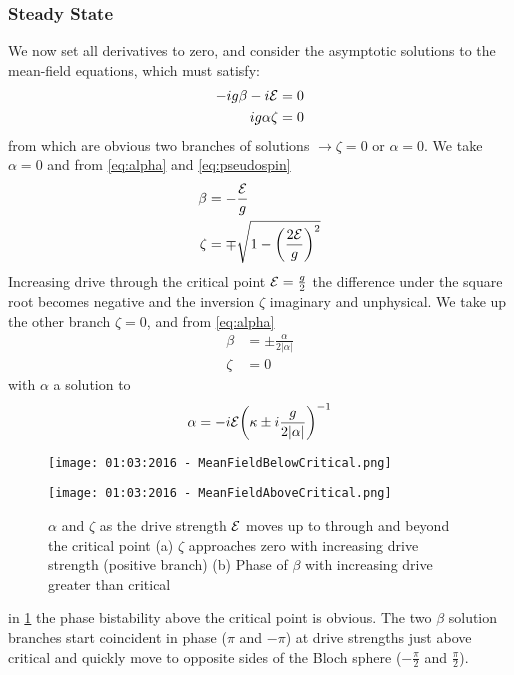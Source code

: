 \subsubsection{Steady State}
We now set all derivatives to zero, and consider the asymptotic solutions to the mean-field equations, which must satisfy:
\begin{align}
  -ig \beta -i \mathcal{E} &= 0 \\
  ig\alpha \zeta &= 0
\end{align}
from which are obvious two branches of solutions $\rightarrow \zeta = 0$ or $\alpha = 0$. We take $\alpha = 0$ and from \cref{eq:alpha} and \cref{eq:pseudospin}
\begin{align}
  \beta &= -\frac{\mathcal{E}}{g} \\
  \zeta &= \mp \sqrt{1 - {\left( \frac{2\mathcal{E}}{g} \right)}^2}
\end{align}
Increasing drive through the critical point $\mathcal{E} = \frac{g}{2}$ the difference under the square root becomes negative and the inversion $\zeta$ imaginary and unphysical. We take up the other branch $\zeta = 0$, and from \cref{eq:alpha}
\begin{align}
  \beta &= \pm \frac{\alpha}{2|\alpha|} \\
  \zeta &= 0
\end{align}
with $\alpha$ a solution to
\begin{equation}
  \alpha = -i \mathcal{E}{\left ( \kappa \pm i \frac{g}{2|\alpha|} \right )}^{-1}
  \label{eq:alphacondnotdet}
\end{equation}
\begin{figure}[ht]
  \begin{minipage}{.5\linewidth}
    \centering
    \texttt{[image: 01:03:2016 - MeanFieldBelowCritical.png]}
  \end{minipage}%
  \begin{minipage}{.5\linewidth}
    \centering
    \texttt{[image: 01:03:2016 - MeanFieldAboveCritical.png]}
  \end{minipage}
  \caption{$\alpha$ and $\zeta$ as the drive strength $\mathcal{E}$ moves up to through and beyond the critical point (a) $\zeta$ approaches zero with increasing drive strength (positive branch)\label{fig:zeta} (b) Phase of $\beta$ with increasing drive greater than critical}\label{fig:alpha}
\end{figure}
in \cref{fig:alpha} the phase bistability above the critical point is obvious. The two $\beta$ solution branches start coincident in phase ($\pi$ and $-\pi$) at drive strengths just above critical and quickly move to opposite sides of the Bloch sphere ($-\frac{\pi}{2}$ and $\frac{\pi}{2}$).

